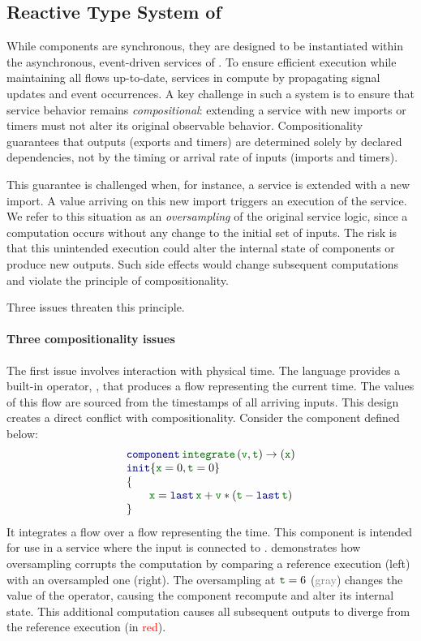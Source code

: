 \subsection{Reactive Type System of \GRSync}
\label{sec:semantics:grsync:react_typing}

While \GRSync components are synchronous, they are designed to be instantiated within the
asynchronous, event-driven services of \GRFRP. To ensure efficient execution while maintaining all
flows up-to-date, services in \GRFRP compute by propagating signal updates and event occurrences.
A key challenge in such a system is to ensure that service behavior remains \emph{compositional}:
extending a service with new imports or timers must not alter its original observable behavior.
Compositionality guarantees that outputs (exports and timers) are determined solely by declared
dependencies, not by the timing or arrival rate of inputs (imports and timers).

This guarantee is challenged when, for instance, a service is extended with a new import. A value
arriving on this new import triggers an execution of the service. We refer to this situation as an
\emph{oversampling} of the original service logic, since a computation occurs without any change to
the initial set of inputs. The risk is that this unintended execution could alter the internal state
of components or produce new outputs. Such side effects would change subsequent computations and
violate the principle of compositionality.

Three issues threaten this principle.

\paragraph{Three compositionality issues}

The first issue involves interaction with physical time. The \GRFRP language provides a built-in
operator, \timeop, that produces a flow representing the current time. The values of this flow are
sourced from the timestamps of all arriving inputs. This design creates a direct conflict with
compositionality.
%
Consider the  component defined below:
\begin{equation*}
    \componentTab[\idf{x} = 0, \idf{t} = 0]{\idf{integrate}}{\idf{v}, \idf{t}}{\idf{x}}{
        \idf{x} = \last{\idf{x}} + \idf{v}*(\idf{t} - \last{\idf{t}})
    }
\end{equation*}
It integrates a flow  over a flow  representing the time. This component is intended
for use in a service where the input  is connected to \timeop.
%
 demonstrates how oversampling corrupts the computation
by comparing a reference execution (left) with an oversampled one (right). The oversampling at
$\idf{t} = 6$ (\textcolor{gray}{gray}) changes the value of the \timeop operator, causing the
component recompute and alter its internal state. This additional computation causes all subsequent
outputs to diverge from the reference execution (in \textcolor{red}{red}).

